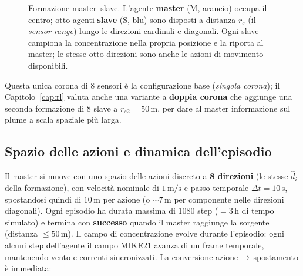 \begin{figure}[H]
\centering
{}
\caption{Formazione master--slave. L'agente \textbf{master} (M, arancio) occupa il centro;
         otto agenti \textbf{slave} (S, blu) sono disposti a distanza $r_s$ (il \emph{sensor
         range}) lungo le direzioni cardinali e diagonali. Ogni slave campiona la
         concentrazione nella propria posizione e la riporta al master; le stesse otto
         direzioni sono anche le azioni di movimento disponibili.}
\label{fig:formazione}
\end{figure}

Questa unica corona di 8 sensori \`e la configurazione base (\emph{singola corona}); il
Capitolo~\ref{cap:rl} valuta anche una variante a \textbf{doppia corona} che aggiunge una
seconda formazione di 8 slave a $r_{s2} = 50\,\text{m}$, per dare al master informazione
sul plume a scala spaziale pi\`u larga.

\subsection{Spazio delle azioni e dinamica dell'episodio}
\label{sec:dinamica}

Il master si muove con uno spazio delle azioni discreto a \textbf{8 direzioni}
(le stesse $\hat{d}_i$ della formazione), con velocit\`a nominale di $1\,\text{m/s}$ e
passo temporale $\Delta t = 10\,\text{s}$, spostandosi quindi di $10\,\text{m}$ per
azione (o $\sim$7\,m per componente nelle direzioni diagonali). Ogni episodio ha durata
massima di 1080 step ($= 3\,\text{h}$ di tempo simulato) e termina con \textbf{successo}
quando il master raggiunge la sorgente (distanza $\leq 50\,\text{m}$). Il campo di
concentrazione evolve durante l'episodio: ogni alcuni step dell'agente il campo MIKE21
avanza di un frame temporale, mantenendo vento e correnti sincronizzati. La conversione
azione\,$\to$\,spostamento \`e immediata:


